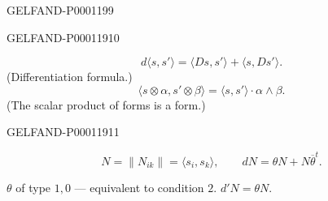 \begin{GelfandAdjacentEvidence}{GELFAND-P000119}{9}

\end{GelfandAdjacentEvidence}
\begin{GelfandAdjacentEvidence}{GELFAND-P000119}{10}


\begin{equation*}
d\langle s,s'\rangle=\langle Ds,s'\rangle+\langle s,Ds'\rangle.
\end{equation*}
(Differentiation formula.)
\begin{equation*}
\langle s\otimes\alpha,s'\otimes\beta\rangle
=\langle s,s'\rangle\cdot\alpha\wedge\beta.
\end{equation*}
(The scalar product of forms is a form.)
\end{GelfandAdjacentEvidence}
\begin{GelfandAdjacentEvidence}{GELFAND-P000119}{11}

\begin{equation*}
N=\|N_{ik}\|=\langle s_i,s_k\rangle,\qquad
dN=\theta N+N\overline\theta^t.
\end{equation*}

$\theta$ of type $1,0$ — equivalent to condition $2$.
$d'N=\theta N$.
\end{GelfandAdjacentEvidence}




